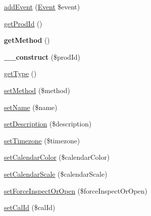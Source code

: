 \begin{DoxyCompactItemize}
\item 
\mbox{\hyperlink{class_eluceo_1_1i_cal_1_1_component_1_1_calendar_a1f0cf8d3ca1bfee4d03b352d2f6d1698}{add\+Event}} (\mbox{\hyperlink{class_eluceo_1_1i_cal_1_1_component_1_1_event}{Event}} \$event)
\item 
\mbox{\hyperlink{class_eluceo_1_1i_cal_1_1_component_1_1_calendar_ab332398ea972edc7fb622b63a91532e2}{get\+Prod\+Id}} ()
\item 
\mbox{\label{class_eluceo_1_1i_cal_1_1_component_1_1_calendar_a5efc8e2d8dc2ef2bd8931a59cd81fa27}} 
{\bfseries get\+Method} ()
\item 
\mbox{\label{class_eluceo_1_1i_cal_1_1_component_1_1_calendar_a8d7eec047840f53c1ce6de22f9f7045a}} 
{\bfseries \+\_\+\+\_\+construct} (\$prod\+Id)
\item 
\mbox{\hyperlink{class_eluceo_1_1i_cal_1_1_component_1_1_calendar_a37cb0ba6b7ffa6b84ca9c06a8be7d882}{get\+Type}} ()
\item 
\mbox{\hyperlink{class_eluceo_1_1i_cal_1_1_component_1_1_calendar_a39023ed69e30af7b94799e7677197d16}{set\+Method}} (\$method)
\item 
\mbox{\hyperlink{class_eluceo_1_1i_cal_1_1_component_1_1_calendar_adf80b9aa9dc6481fe45b78142ae1aec2}{set\+Name}} (\$name)
\item 
\mbox{\hyperlink{class_eluceo_1_1i_cal_1_1_component_1_1_calendar_aedd67c51c2fe1386f132bfb45148cb59}{set\+Description}} (\$description)
\item 
\mbox{\hyperlink{class_eluceo_1_1i_cal_1_1_component_1_1_calendar_a4f3e601c0ef99350dc2b4d454fb126c9}{set\+Timezone}} (\$timezone)
\item 
\mbox{\hyperlink{class_eluceo_1_1i_cal_1_1_component_1_1_calendar_ac77495dbc6d258d3a385026f267966c3}{set\+Calendar\+Color}} (\$calendar\+Color)
\item 
\mbox{\hyperlink{class_eluceo_1_1i_cal_1_1_component_1_1_calendar_a869f95eff68194dc77eb549b17516feb}{set\+Calendar\+Scale}} (\$calendar\+Scale)
\item 
\mbox{\hyperlink{class_eluceo_1_1i_cal_1_1_component_1_1_calendar_a623d0cda85b6b5eda9600aa035b6388f}{set\+Force\+Inspect\+Or\+Open}} (\$force\+Inspect\+Or\+Open)
\item 
\mbox{\hyperlink{class_eluceo_1_1i_cal_1_1_component_1_1_calendar_a17acdac642afaf8e87e305fa44621564}{set\+Cal\+Id}} (\$cal\+Id)
\item 

\end{DoxyCompactItemize}
